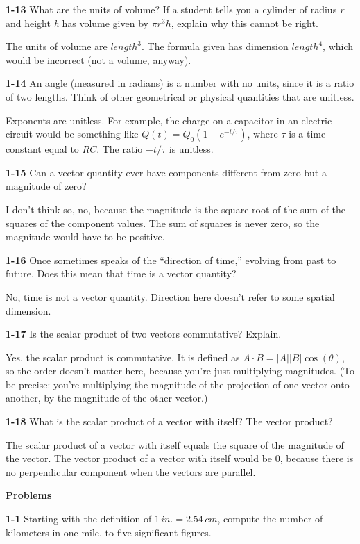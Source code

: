 \documentclass{amsart}
\begin{document}
\textbf{1-13} What are the units of volume?
If a student tells you a cylinder of radius \emph{r} and height \emph{h} has volume given by $\pi r^{3} h$,
explain why this cannot be right.

The units of volume are $length^{3}$.  The formula given has dimension $length^{4}$,
which would be incorrect (not a volume, anyway).

\textbf{1-14} An angle (measured in radians) is a number with no units, since it is a ratio of two lengths.
Think of other geometrical or physical quantities that are unitless.

Exponents are unitless.  For example, the charge on a capacitor in an electric circuit
would be something like $Q(t) = Q_{0} (1-e^{-t/\tau})$, where $\tau$ is a time constant equal to $RC$.
The ratio $-t/\tau$ is unitless.

\textbf{1-15} Can a vector quantity ever have components different from zero but a magnitude of zero?

I don't think so, no, because the magnitude is the square root of the sum of the squares of the component values.
The sum of squares is never zero, so the magnitude would have to be positive.

\textbf{1-16} Once sometimes speaks of the ``direction of time,'' evolving from past to future.
Does this mean that time is a vector quantity?

No, time is not a vector quantity.  Direction here doesn't refer to some spatial dimension.

\textbf{1-17} Is the scalar product of two vectors commutative?  Explain.

Yes, the scalar product is commutative.
It is defined as $A \cdot B = \lvert A \rvert \lvert B \rvert \cos(\theta)$, so the order doesn't matter here,
because you're just multiplying magnitudes.
(To be precise: you're multiplying the magnitude of the projection of one vector onto another,
by the magnitude of the other vector.)

\textbf{1-18} What is the scalar product of a vector with itself?  The vector product?

The scalar product of a vector with itself equals the square of the magnitude of the vector.
The vector product of a vector with itself would be 0, because there is no perpendicular component when the vectors are parallel.


\textbf{Problems}

\textbf{1-1} Starting with the definition of $1 \, in. = 2.54 \, cm$,
compute the number of kilometers in one mile, to five significant figures.
\end{document}
